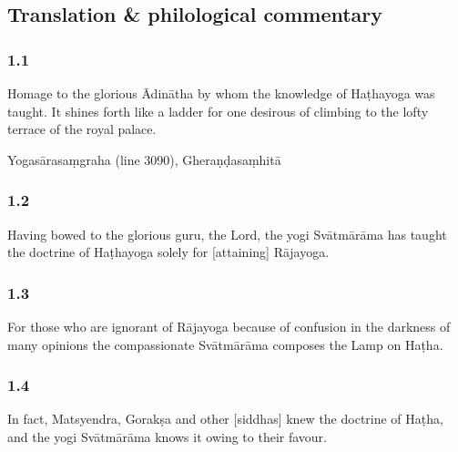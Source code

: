 \pagestyle{HPed}
\begin{ekdosis}

\chapter*{Translation \& philological commentary}
\subsection*{1.1}
\begin{translation}[hp01_001]
Homage to the glorious Ādinātha by whom the knowledge of Haṭhayoga was taught. It shines forth like a ladder for one desirous of climbing to the lofty terrace of the royal palace.
\end{translation}

\begin{sources}[hp01_001]
Yogasārasaṃgraha (line 3090), Gheraṇḍasaṃhitā
\end{sources}


\subsection*{1.2}
\begin{translation}[hp01_002]
Having bowed to the glorious guru, the Lord, the yogi Svātmārāma has taught the doctrine of Haṭhayoga solely for [attaining] Rājayoga.
\end{translation}


\subsection*{1.3}
\begin{translation}[hp01_003]
For those who are ignorant of Rājayoga because of confusion in the darkness of many opinions the compassionate Svātmārāma composes the Lamp on Haṭha.
\end{translation}


\subsection*{1.4}
\begin{translation}[hp01_004]
In fact, Matsyendra, Gorakṣa and other [siddhas] knew the doctrine of Haṭha, and the yogi Svātmārāma knows it owing to their favour.
\end{translation}


\end{ekdosis}
